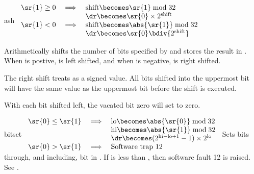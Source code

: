 \begin{instruction}{ash}
     {
       \begin{math}
         \begin{array}{rcl}
           \sr{1} \geq 0 & \implies & \textrm{shift} \becomes \sr{1} \bmod 32        \\
              &          & \dr \becomes \sr{0} \times 2^\textrm{shift}   \\
           \sr{1} <    0 & \implies & \textrm{shift} \becomes \abs{\sr{1}} \bmod 32  \\
                         &          & \dr \becomes \sr{0} \bdiv {2^\textrm{shift}} \\
         \end{array}
       \end{math}
     }
     {
       Arithmetically shifts  the number of bits specified by
        and stores the result in \dr.  When  is postive,
        is left shifted, and when  is negative,  is
       right shifted.

       The right shift treats  as a signed value.  All bits
       shifted into the uppermost bit will have the same value as the
       uppermost bit before the shift is executed.

       With each bit shifted left, the vacated bit zero will set
       to zero.
     }
\end{instruction}


\begin{instruction}{bitset}
     {
       \begin{math}
         \begin{array}{rcl}
           \sr{0} \leq \sr{1} & \implies & \textrm{lo} \becomes \abs{\sr{0}} \bmod 32        \\
                              &          & \textrm{hi} \becomes \abs{\sr{1}} \bmod 32        \\
                              &          & \dr \becomes (2^{\textrm{hi} - \textrm{lo} + 1} - 1) \times 2^\textrm{lo} \\
           \sr{0} >    \sr{1} & \implies & \textrm{Software trap 12}
         \end{array}
       \end{math}
     }
     {
       Sets bits  through, and including, bit  in \dr.
       If  is less than , then software fault 12 is
       raised.  See .
     }
\end{instruction}


